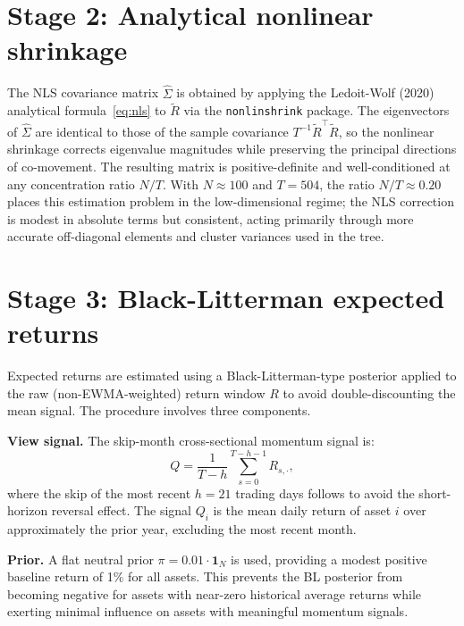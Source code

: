 \documentclass[a4paper,12pt]{report}
\begin{document}
\section{Stage 2: Analytical nonlinear shrinkage}
\label{sec:meth-nls}

The NLS covariance matrix $\hat{\Sigma}$ is obtained by applying the
Ledoit-Wolf (2020) analytical formula~\eqref{eq:nls} to $\tilde{R}$ via the
\texttt{nonlinshrink} package. The eigenvectors of $\hat{\Sigma}$ are
identical to those of the sample covariance $T^{-1}\tilde{R}^{\top}\tilde{R}$,
so the nonlinear shrinkage corrects eigenvalue magnitudes while preserving
the principal directions of co-movement. The resulting matrix is
positive-definite and well-conditioned at any concentration ratio $N/T$.
With $N \approx 100$ and $T = 504$, the ratio $N/T \approx 0.20$ places this
estimation problem in the low-dimensional regime; the NLS correction is
modest in absolute terms but consistent, acting primarily through more
accurate off-diagonal elements and cluster variances used in the tree.

\section{Stage 3: Black-Litterman expected returns}
\label{sec:meth-bl}

Expected returns are estimated using a Black-Litterman-type posterior applied
to the raw (non-EWMA-weighted) return window $R$ to avoid double-discounting
the mean signal. The procedure involves three components.

\textbf{View signal.} The skip-month cross-sectional momentum signal is:
\begin{equation}
  Q = \frac{1}{T - h}\sum_{s=0}^{T-h-1} R_{s,\cdot},
  \label{eq:blsignal}
\end{equation}
where the skip of the most recent $h = 21$ trading days follows
\citet{jegadeesh1993} to avoid the short-horizon reversal effect. The signal
$Q_i$ is the mean daily return of asset $i$ over approximately the prior
year, excluding the most recent month.

\textbf{Prior.} A flat neutral prior $\pi = 0.01 \cdot \mathbf{1}_N$ is
used, providing a modest positive baseline return of 1\% for all assets.
This prevents the BL posterior from becoming negative for assets with
near-zero historical average returns while exerting minimal influence on
assets with meaningful momentum signals.
\end{document}

